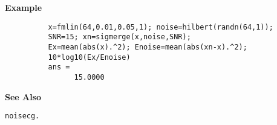 {\bf \large {}\selectfont Example}\begin{verbatim}
          x=fmlin(64,0.01,0.05,1); noise=hilbert(randn(64,1));
          SNR=15; xn=sigmerge(x,noise,SNR);
          Ex=mean(abs(x).^2); Enoise=mean(abs(xn-x).^2);
          10*log10(Ex/Enoise)
          ans = 
                15.0000

\end{verbatim}
\vspace*{.5cm}

{\bf \large {}\selectfont See Also}\\
\hspace*{1.5cm}
\begin{minipage}[t]{13.5cm}
\begin{verbatim}
noisecg.
\end{verbatim}
\end{minipage}
